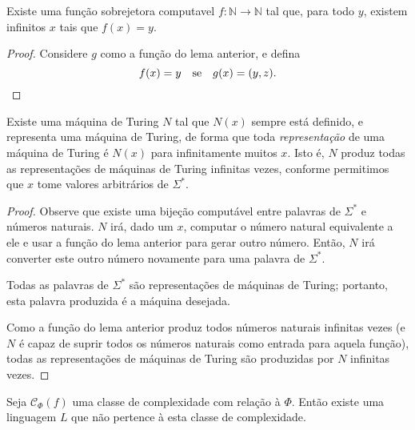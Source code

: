 \begin{lemma}
    Existe uma função sobrejetora computavel
    $f: \mathbb N \rightarrow \mathbb N$
    tal que,
    para todo $y$,
    existem infinitos $x$ tais que $f(x) = y$.
\end{lemma}
\begin{proof}
    Considere $g$ como a função do lema anterior,
    e defina
    \begin{equation*}
        f(x) = y \quad \text{se} \quad g(x) = (y, z). \qedhere
    \end{equation*}
\end{proof}

\begin{lemma}
    Existe uma máquina de Turing $N$
    tal que $N(x)$ sempre está definido,
    e representa uma máquina de Turing,
    de forma que toda \emph{representação}
    de uma máquina de Turing
    é $N(x)$ para infinitamente muitos $x$.
    Isto é, $N$ produz todas as representações de máquinas de Turing
    infinitas vezes,
    conforme permitimos que $x$ tome valores arbitrários de $\Sigma^*$.
\end{lemma}

\begin{proof}
    Observe que existe uma bijeção computável
    entre palavras de $\Sigma^*$
    e números naturais.
    $N$ irá,
    dado um $x$,
    computar o número natural equivalente a ele
    e usar a função do lema anterior
    para gerar outro número.
    Então, $N$ irá converter este outro número
    novamente para uma palavra de $\Sigma^*$.

    Todas as palavras de $\Sigma^*$
    são representações de máquinas de Turing;
    portanto, esta palavra produzida é a máquina desejada.

    Como a função do lema anterior
    produz todos números naturais infinitas vezes
    (e $N$ é capaz de suprir todos os números naturais
    como entrada para aquela função),
    todas as representações de máquinas de Turing
    são produzidas por $N$ infinitas vezes.
\end{proof}

\begin{theorem}
    Seja $\mathcal C_\Phi(f)$ uma classe de complexidade
    com relação à $\Phi$.
    Então existe uma linguagem $L$
    que não pertence à esta classe de complexidade.
\end{theorem}

